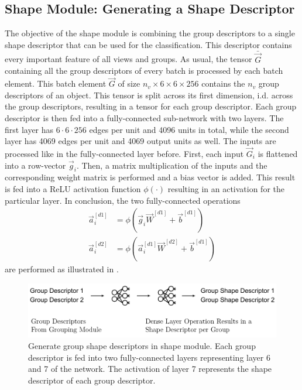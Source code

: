 \subsection{Shape Module: Generating a Shape Descriptor}
\label{sec:architecture-shape-module}
The objective of the shape module is combining the group descriptors to a single shape descriptor that can be used for the classification.
This descriptor contains every important feature of all views and groups.
As usual, the tensor $\bar{\vec{G}}$ containing all the group descriptors of every batch is processed by each batch element.
This batch element $\vec{G}$ of size $n_v \times 6 \times 6 \times 256$ contains the $n_v$ group descriptors of an object.
This tensor is split across its first dimension, i.d. across the group descriptors, resulting in a tensor for each group descriptor.
Each group descriptor is then fed into a fully-connected sub-network with two layers.
The first layer has $6\cdot6\cdot256$ edges per unit and 4096 units in total, while the second layer has 4069 edges per unit and 4069 output units as well.
The inputs are processed like in the fully-connected layer before.
First, each input $\vec{G}_i$ is flattened into a row-vector $\vec{g}_i$.
Then, a matrix multiplication of the inputs and the corresponding weight matrix is performed and a bias vector is added.
This result is fed into a ReLU activation function $\phi(\cdot)$ resulting in an activation for the particular layer.
In conclusion, the two fully-connected operations
\begin{subequations}
	\begin{align}
		\vec{a}^{[d1]}_i &= \phi(\vec{g}_i \vec{W}^{[d1]} + \vec{b}^{[d1]}) \\
		\vec{a}^{[d2]}_i &= \phi(\vec{a}^{[d1]}_i \vec{W}^{[d2]} + \vec{b}^{[d1]})
	\end{align}
\end{subequations}
are performed as illustrated in .
\begin{figure}
	\centering
	\includegraphics[]{images/shape_module_group_shape.pdf}
	\caption[Generate group shape descriptors in shape module]{Generate group shape descriptors in shape module. Each group descriptor is fed into two fully-connected layers representing layer 6 and 7 of the network. The activation of layer 7 represents the shape descriptor of each group descriptor.}
	\label{fig:shape-module-group-shape}
\end{figure}
